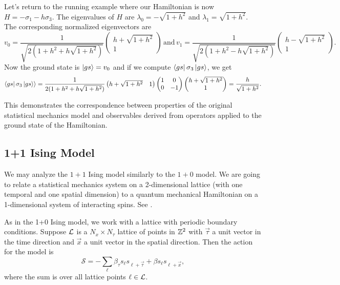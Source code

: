 \documentclass[11pt,reqno]{amsart}
\numberwithin{equation}{section}
\begin{document}
	Let's return to the running example where our Hamiltonian is now $H=-\sigma_1-h\sigma_3$.
	The eigenvalues of $H$ are $\lambda_0=-\sqrt{1+h^2}$ and $\lambda_1=\sqrt{1+h^2}$.
	The corresponding normalized eigenvectors are
		\[v_0= \frac{1}{\sqrt{2(1+h^2+h\sqrt{1+h^2})}}\begin{pmatrix}
		h+\sqrt{1+h^2} \\ 1
		\end{pmatrix} \, \text{and} \, v_1= \frac{1}{\sqrt{2(1+h^2-h\sqrt{1+h^2})}}\begin{pmatrix}
		h-\sqrt{1+h^2} \\ 1
		\end{pmatrix}. \]
	Now the ground state is $\ket{gs}=v_0$ and if we compute $\bra{gs} \sigma_3 \ket{gs}$, we get
		\[\bra{gs} \sigma_3 \ket{gs} \rangle=\frac{1}{2(1+h^2+h\sqrt{1+h^2})}\begin{pmatrix}
		h+\sqrt{1+h^2} & 1
		\end{pmatrix}
		\begin{pmatrix}
		1 & 0 \\
		0 & -1
		\end{pmatrix}
		\begin{pmatrix}
		h+\sqrt{1+h^2} \\ 1
		\end{pmatrix}=\frac{h}{\sqrt{1+h^2}} .\]
	
	This demonstrates the correspondence between properties of the original statistical mechanics model and observables derived from operators applied to the ground state of the Hamiltonian.
	
	\subsection{1+1 Ising Model}
	
	We may analyze the $1+1$ Ising model similarly to the $1+0$ model. 
	We are going to relate a statistical mechanics system on a 2-dimensional lattice (with one temporal and one spatial dimension) to a quantum mechanical Hamiltonian on a 1-dimensional system of interacting spins.  
	See \cite{FradkinSusskind78,KogutGaugeSummary}.
	
	As in the 1+0 Ising model, we work with a lattice with periodic boundary conditions. 
	Suppose $\mathcal{L}$ is a $N_x \times N_\tau$ lattice of points in $\mathbb{Z}^2$ with $\vec{\tau}$ a unit vector in the time direction and $\vec{x}$ a unit vector in the spatial direction. 
	Then the action for the model is 
	\[ \mathcal{S}= -\sum_{\ell} \beta_\tau s_{\ell}s_{\ell+\vec{\tau}}+\beta s_{\ell}s_{\ell+\vec{x}}, \]
	where the sum is over all lattice points $\ell \in \mathcal{L}$.
	
\end{document}

